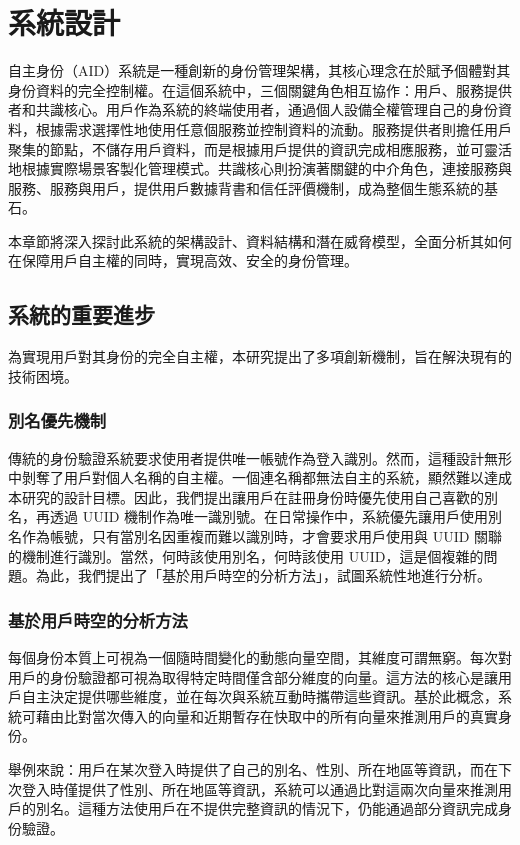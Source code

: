 
\chapter{系統設計}
自主身份（AID）系統是一種創新的身份管理架構，其核心理念在於賦予個體對其身份資料的完全控制權。在這個系統中，三個關鍵角色相互協作：用戶、服務提供者和共識核心。用戶作為系統的終端使用者，通過個人設備全權管理自己的身份資料，根據需求選擇性地使用任意個服務並控制資料的流動。服務提供者則擔任用戶聚集的節點，不儲存用戶資料，而是根據用戶提供的資訊完成相應服務，並可靈活地根據實際場景客製化管理模式。共識核心則扮演著關鍵的中介角色，連接服務與服務、服務與用戶，提供用戶數據背書和信任評價機制，成為整個生態系統的基石。

本章節將深入探討此系統的架構設計、資料結構和潛在威脅模型，全面分析其如何在保障用戶自主權的同時，實現高效、安全的身份管理。
\section{系統的重要進步}
為實現用戶對其身份的完全自主權，本研究提出了多項創新機制，旨在解決現有的技術困境。
\subsection{別名優先機制}
傳統的身份驗證系統要求使用者提供唯一帳號作為登入識別。然而，這種設計無形中剝奪了用戶對個人名稱的自主權。一個連名稱都無法自主的系統，顯然難以達成本研究的設計目標。因此，我們提出讓用戶在註冊身份時優先使用自己喜歡的別名，再透過 UUID 機制\cite{uuid}作為唯一識別號。在日常操作中，系統優先讓用戶使用別名作為帳號，只有當別名因重複而難以識別時，才會要求用戶使用與 UUID 關聯的機制進行識別。當然，何時該使用別名，何時該使用 UUID，這是個複雜的問題。為此，我們提出了「基於用戶時空的分析方法」，試圖系統性地進行分析。
\subsection{基於用戶時空的分析方法}
每個身份本質上可視為一個隨時間變化的動態向量空間，其維度可謂無窮。每次對用戶的身份驗證都可視為取得特定時間僅含部分維度的向量。這方法的核心是讓用戶自主決定提供哪些維度，並在每次與系統互動時攜帶這些資訊。基於此概念，系統可藉由比對當次傳入的向量和近期暫存在快取中的所有向量來推測用戶的真實身份。

舉例來說：用戶在某次登入時提供了自己的別名、性別、所在地區等資訊，而在下次登入時僅提供了性別、所在地區等資訊，系統可以通過比對這兩次向量來推測用戶的別名。這種方法使用戶在不提供完整資訊的情況下，仍能通過部分資訊完成身份驗證。

